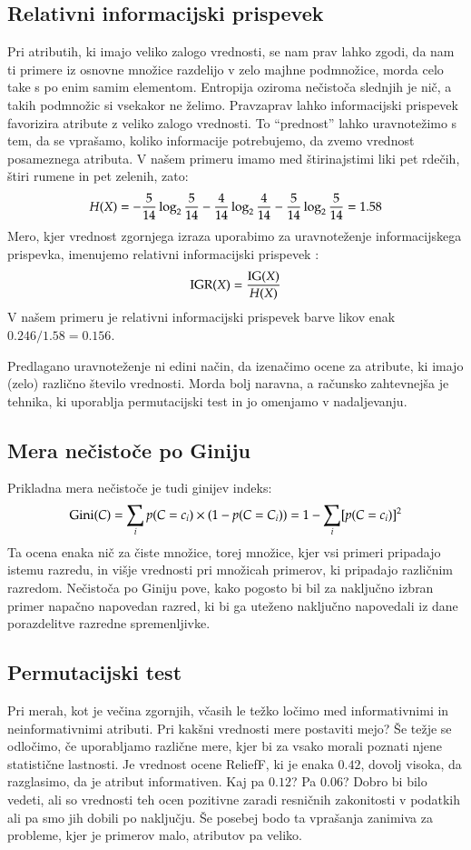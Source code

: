 \subsection{Relativni informacijski prispevek}

Pri atributih, ki imajo veliko zalogo vrednosti, se nam prav lahko zgodi, da nam ti primere iz osnovne množice razdelijo v zelo majhne podmnožice, morda celo take s po enim samim elementom. Entropija oziroma nečistoča slednjih je nič, a takih podmnožic si vsekakor ne želimo. Pravzaprav lahko informacijski prispevek favorizira atribute z veliko zalogo vrednosti. To ``prednost'' lahko uravnotežimo s tem, da se vprašamo, koliko informacije potrebujemo, da zvemo vrednost posameznega atributa. V našem primeru imamo med štirinajstimi liki pet rdečih, štiri rumene in pet zelenih, zato:
$$ H(X)=-{5\over 14}\log_2{5\over 14}-{4\over 14}\log_2{4\over 14}-{5\over 14}\log_2{5\over 14}=1.58 $$
%
Mero, kjer vrednost zgornjega izraza uporabimo za uravnoteženje informacijskega prispevka, imenujemo relativni informacijski prispevek :
%
$$ {\rm IGR}(X) = {{\rm IG}(X)\over H(X)} $$
V našem primeru je relativni informacijski prispevek barve likov enak $0.246/1.58=0.156$.

Predlagano uravnoteženje ni edini način, da izenačimo ocene za atribute, ki imajo (zelo) različno število vrednosti. Morda bolj naravna, a računsko zahtevnejša je tehnika, ki uporablja permutacijski test in jo omenjamo v nadaljevanju.

\subsection{Mera nečistoče po Giniju}

Prikladna mera nečistoče je tudi ginijev indeks:
$$ {\rm Gini}(C)=\sum_{i}p(C=c_i)\times (1-p(C=C_i)) = 1 - \sum_i [p(C=c_i)]^2 $$
Ta ocena enaka nič za čiste množice, torej množice, kjer vsi primeri pripadajo istemu razredu, in višje vrednosti pri množicah primerov, ki pripadajo različnim razredom. Nečistoča po Giniju pove, kako pogosto bi bil za naključno izbran primer napačno napovedan razred, ki bi ga uteženo naključno napovedali iz dane porazdelitve razredne spremenljivke.

\subsection{Permutacijski test}

Pri merah, kot je večina zgornjih, včasih le težko ločimo med informativnimi in neinformativnimi atributi. Pri kakšni vrednosti mere postaviti mejo? Še težje se odločimo, če uporabljamo različne mere, kjer bi za vsako morali poznati njene statistične lastnosti. Je vrednost ocene ReliefF, ki je enaka $0.42$, dovolj visoka, da razglasimo, da je atribut informativen. Kaj pa $0.12$? Pa $0.06$? Dobro bi bilo vedeti, ali so vrednosti teh ocen pozitivne zaradi resničnih zakonitosti v podatkih ali pa smo jih dobili po naključju. Še posebej bodo ta vprašanja zanimiva za probleme, kjer je primerov malo, atributov pa veliko. 

